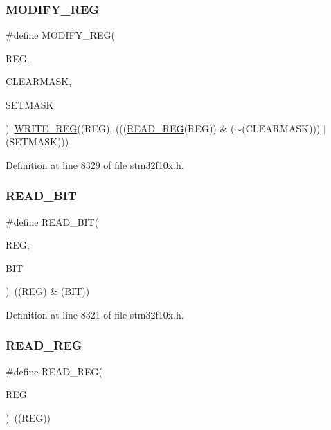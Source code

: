 \subsubsection{\texorpdfstring{M\+O\+D\+I\+F\+Y\+\_\+\+R\+EG}{MODIFY\_REG}}
{\footnotesize\ttfamily \#define M\+O\+D\+I\+F\+Y\+\_\+\+R\+EG(\begin{DoxyParamCaption}\item[{}]{R\+EG,  }\item[{}]{C\+L\+E\+A\+R\+M\+A\+SK,  }\item[{}]{S\+E\+T\+M\+A\+SK }\end{DoxyParamCaption})~\hyperlink{group___exported__macro_ga32f78bffcaf6d13023dcd7f05e0c4d57}{W\+R\+I\+T\+E\+\_\+\+R\+EG}((R\+EG), (((\hyperlink{group___exported__macro_gae7f188a4d26c9e713a48414783421071}{R\+E\+A\+D\+\_\+\+R\+EG}(R\+EG)) \& ($\sim$(C\+L\+E\+A\+R\+M\+A\+SK))) $\vert$ (S\+E\+T\+M\+A\+SK)))}



Definition at line 8329 of file stm32f10x.\+h.

\mbox{\label{group___exported__macro_ga822bb1bb9710d5f2fa6396b84e583c33}} 
\subsubsection{\texorpdfstring{R\+E\+A\+D\+\_\+\+B\+IT}{READ\_BIT}}
{\footnotesize\ttfamily \#define R\+E\+A\+D\+\_\+\+B\+IT(\begin{DoxyParamCaption}\item[{}]{R\+EG,  }\item[{}]{B\+IT }\end{DoxyParamCaption})~((R\+EG) \& (B\+IT))}



Definition at line 8321 of file stm32f10x.\+h.

\mbox{\label{group___exported__macro_gae7f188a4d26c9e713a48414783421071}} 
\subsubsection{\texorpdfstring{R\+E\+A\+D\+\_\+\+R\+EG}{READ\_REG}}
{\footnotesize\ttfamily \#define R\+E\+A\+D\+\_\+\+R\+EG(\begin{DoxyParamCaption}\item[{}]{R\+EG }\end{DoxyParamCaption})~((R\+EG))}



